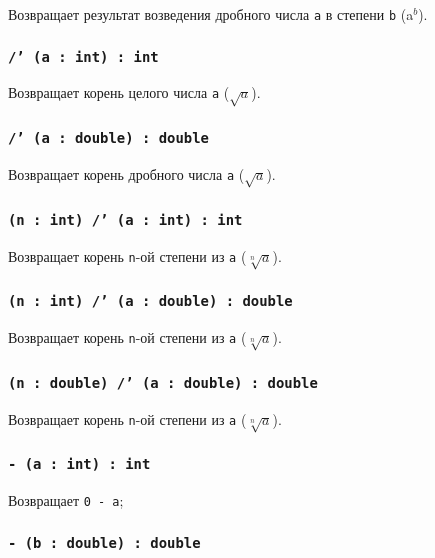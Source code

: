 Возвращает результат возведения дробного числа \texttt{a} в степени \texttt{b} (a$^b$).

\subsubsection{\texttt{/' (a : int) : int}}

Возвращает корень целого числа \texttt{a} ($\sqrt{a}$).

\subsubsection{\texttt{/' (a : double) : double}}

Возвращает корень дробного числа \texttt{a} ($\sqrt{a}$).

\subsubsection{\texttt{(n : int) /' (a : int) : int}}

Возвращает корень \texttt{n}-ой степени из \texttt{a} ($\sqrt[n]{a}$).

\subsubsection{\texttt{(n : int) /' (a : double) : double}}

Возвращает корень \texttt{n}-ой степени из \texttt{a} ($\sqrt[n]{a}$).

\subsubsection{\texttt{(n : double) /' (a : double) : double}}

Возвращает корень \texttt{n}-ой степени из \texttt{a} ($\sqrt[n]{a}$).


\subsubsection{\texttt{- (a : int) : int}}

Возвращает \texttt{0 - a};

\subsubsection{\texttt{- (b : double) : double}}


